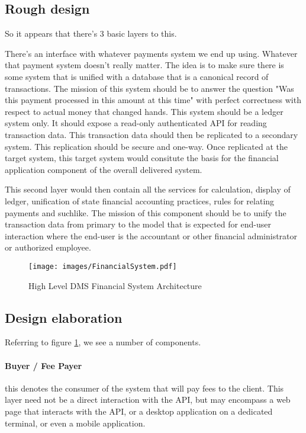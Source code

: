 \subsection{Rough design}
So it appears that there's 3 basic layers to this.

There's an interface with whatever payments system we end up using.  Whatever
that payment system doesn't really matter.  The idea is to make sure there is
some system that is unified with a database that is a canonical record of
transactions.  The mission of this system should be to answer the question "Was
this payment processed in this amount at this time" with perfect correctness
with respect to actual money that changed hands.  This system should be a
ledger system only.  It should expose a read-only authenticated API for reading
transaction data.  This transaction data should then be replicated to a
secondary system.  This replication should be secure and one-way.  Once
replicated at the target system, this target system would consitute the basis
for the financial application component of the overall delivered system.

This second layer would then contain all the services for calculation, display
of ledger, unification of state financial accounting practices, rules for
relating payments and suchlike.  The mission of this component should be to
unify the transaction data from primary to the model that is expected for
end-user interaction where the end-user is the accountant or other financial
administrator or authorized employee.

\begin{figure}[h]
	\begin{center}
		\texttt{[image: images/FinancialSystem.pdf]}
	\end{center}
	\caption{High Level DMS Financial System Architecture}
	\label{fig:fsArch}
\end{figure}

\subsection{Design elaboration}
Referring to figure \ref{fig:fsArch}, we see a number of components.

\paragraph{Buyer / Fee Payer} this denotes the consumer of the system that will
pay fees to the client.  This layer need not be a direct interaction with the
API, but may encompass a web page that interacts with the API, or a desktop
application on a dedicated terminal, or even a mobile application.

